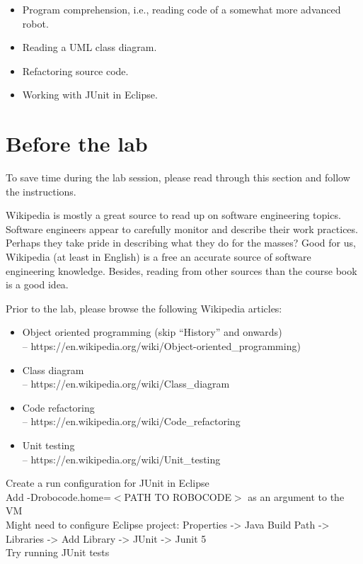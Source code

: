 \documentclass{scrreprt}
\begin{document}
\begin{itemize}
\item Program comprehension, i.e., reading code of a somewhat more advanced robot.
\item Reading a UML class diagram.
\item Refactoring source code.
\item Working with JUnit in Eclipse.
\end{itemize}

\chapter{Before the lab}
To save time during the lab session, please read through this section and follow the instructions.

Wikipedia is mostly a great source to read up on software engineering topics. Software engineers appear to carefully monitor and describe their work practices. Perhaps they take pride in describing what they do for the masses? Good for us, Wikipedia (at least in English) is a free an accurate source of software engineering knowledge. Besides, reading from other sources than the course book is a good idea.

Prior to the lab, please browse the following Wikipedia articles:

\begin{itemize}
\item Object oriented programming (skip ``History'' and onwards)\\-- https://en.wikipedia.org/wiki/Object-oriented_programming)
\item Class diagram\\-- https://en.wikipedia.org/wiki/Class_diagram
\item Code refactoring\\-- https://en.wikipedia.org/wiki/Code_refactoring
\item Unit testing\\-- https://en.wikipedia.org/wiki/Unit_testing
\end{itemize}

Create a run configuration for JUnit in Eclipse\\
Add -Drobocode.home=$<$PATH TO ROBOCODE$>$ as an argument to the VM\\
Might need to configure Eclipse project: Properties -> Java Build Path -> Libraries -> Add Library -> JUnit -> Junit 5\\
Try running JUnit tests
\end{document}

